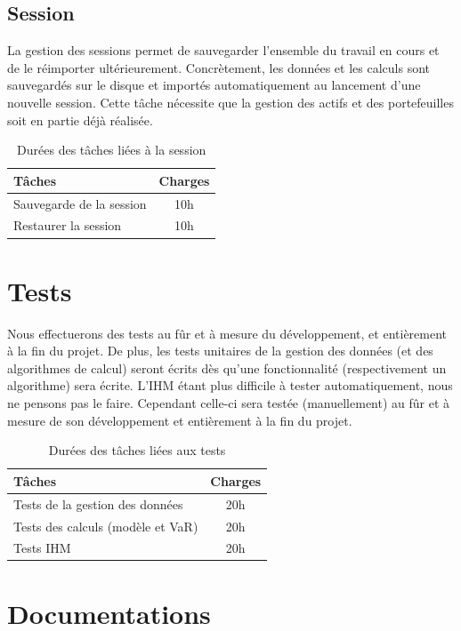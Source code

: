 \documentclass[a4paper]{report}
\begin{document}
\subsection{Session}
La gestion des sessions permet de sauvegarder l'ensemble du travail en cours et de le réimporter ultérieurement. Concrètement, les données et les calculs sont sauvegardés sur le disque et importés automatiquement au lancement d'une nouvelle session. Cette tâche nécessite que la gestion des actifs et des portefeuilles soit en partie déjà réalisée.


\begin{table}[H]
\centering
  \begin{tabularx}{0.8\textwidth}{| X | c |}
    \hline
	Tâches & Charges \\
    \hline
    Sauvegarde de la session &  10h \\
    Restaurer la session &  10h \\
    \hline
  \end{tabularx}
  \caption{Durées des tâches liées à la session}
\end{table}


\section{Tests}

Nous effectuerons des tests au fûr et à mesure du développement, et entièrement à la fin du projet. De plus, les tests unitaires de la gestion des données (et des algorithmes de calcul) seront écrits dès qu'une fonctionnalité (respectivement un algorithme) sera écrite. L'IHM étant plus difficile à tester automatiquement, nous ne pensons pas le faire. Cependant celle-ci sera testée (manuellement) au fûr et à mesure de son développement et entièrement à la fin du projet.


\begin{table}[H]
\centering
  \begin{tabularx}{0.8\textwidth}{| X | c |}
    \hline
	Tâches & Charges \\
    \hline
    Tests de la gestion des données & 20h \\
    Tests des calculs (modèle et VaR) & 20h \\
    Tests IHM & 20h \\
    \hline
  \end{tabularx}
  \caption{Durées des tâches liées aux tests}
\end{table}


\section{Documentations}
\end{document}
